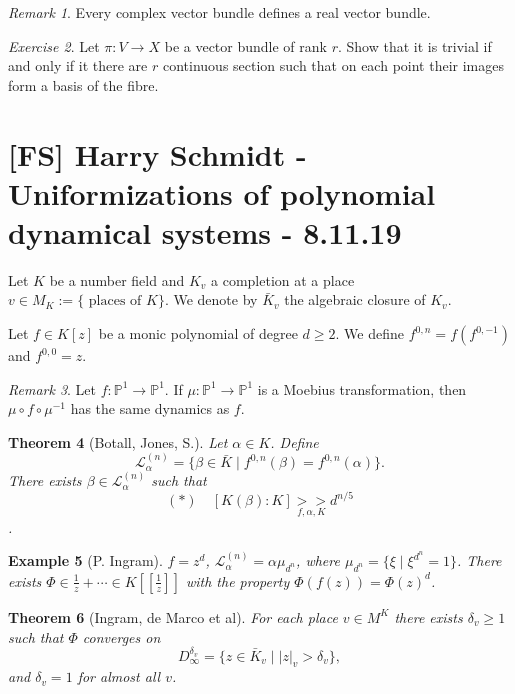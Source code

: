 \documentclass[12pt]{article}
\theoremstyle{darkgreentheorem}
\newtheorem{thm}{Theorem}[section]
\theoremstyle{darkbluedefinition}
\theoremstyle{darkredexample}
\newtheorem{exa}[thm]{Example}
\theoremstyle{remark}
\newtheorem{rem}[thm]{Remark}
\newtheorem{exe}[thm]{Exercise}
\newcommand{\1}{\mathbbm{1}}
\renewcommand{\P}{\mathbb{P}}
\renewcommand{\L}{\mathcal{L}}
\begin{document}
\begin{rem}
    Every complex vector bundle defines a real vector bundle.
\end{rem}

\begin{exe}
    Let $\pi\colon V\to X$ be a vector bundle of rank $r$.
    Show that it is trivial if and only if it there are $r$ continuous section such that on each point their images form a basis of the fibre.
\end{exe}

\section{[FS] Harry Schmidt - Uniformizations of polynomial dynamical systems - 8.11.19}

Let $K$ be a number field and $K_{v}$ a completion at a place $v\in M_{K}:=\{ \text{ places of }K\}$.
We denote by $\bar{K}_{v}$ the algebraic closure of $K_{v}$.

Let $f\in K[z]$ be a monic polynomial of degree $d\geqslant 2$.
We define $f^{0,n}=f(f^{0,-1})$ and $f^{0,0}=z$.

\begin{rem}
    Let $f\colon \P^{1}\to \P^{1}$.
    If $\mu\colon \P^{1}\to \P^{1}$ is a Moebius transformation, then $\mu\circ f\circ \mu^{-1}$ has the same dynamics as $f$.
\end{rem}

\begin{thm}[Botall, Jones, S.]
    Let $\alpha\in K$.
    Define
    \[ \L_{\alpha}^{(n)}=\{ \beta\in \bar{K}\mid f^{0,n}(\beta)=f^{0,n}(\alpha)\}. \]
    There exists $\beta\in \L_{\alpha}^{(n)}$ such that
    \[ (*)\quad [K(\beta):K]\underset{f,\alpha,K}{>>}d^{n/5}\].
\end{thm}

\begin{exa}[P. Ingram]
    $f=z^{d}$, $\L_{\alpha}^{(n)}=\alpha\mu_{d^{n}}$, where $\mu_{d^{n}}=\{ \xi \mid \xi^{d^{n}}=1\}$.
    There exists $\Phi\in \frac{1}{z}+\cdots \in K[[\frac{1}{z}]]$ with the property $\Phi(f(z))=\Phi(z)^{d}$.
\end{exa}

\begin{thm}[Ingram, de Marco et al]
    For each place $v\in M^{K}$ there exists $\delta_{v}\geqslant 1$ such that $\Phi$ converges on
    \[ D_{\infty}^{\delta_{v}}=\{ z\in \bar{K}_{v}\mid |z|_{v}>\delta_{v}\},\]
    and $\delta_{v}=1$ for almost all $v$.
\end{thm}
\end{document}
